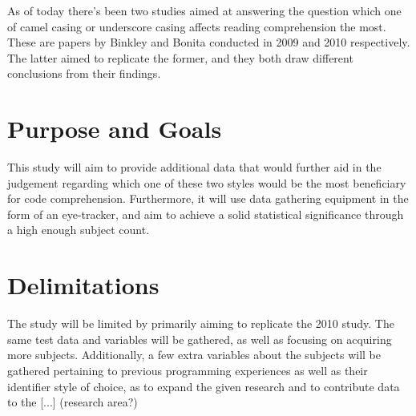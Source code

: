 As of today there's been two studies aimed at answering the question which one of camel casing or underscore casing affects reading comprehension the most. These are papers by Binkley \etal \cite{to-camelCase-or-under-score} and Bonita \etal \cite{eye-tracking-study} conducted in 2009 and 2010 respectively. The latter aimed to replicate the former, and they both draw different conclusions from their findings.





\section{Purpose and Goals}
\iffalse
\begin{itemize}
	\item Write about the grand scheme of things
	\item Set the correct expectations
	\item What can I expect to learn if I keep on reading?
	\item What are the success criteria for this work?
	\item How will the work be evaluated?
\end{itemize}
\fi

This study will aim to provide additional data that would further aid in the judgement regarding which one of these two styles would be the most beneficiary for code comprehension. Furthermore, it will use data gathering equipment in the form of an eye-tracker, and aim to achieve a solid statistical significance through a high enough subject count.

\section{Delimitations}
\iffalse
\begin{itemize}
	\item Scale down expectations and clarify
\end{itemize}
\fi

The study will be limited by primarily aiming to replicate the 2010 study. The same test data and variables will be gathered, as well as focusing on acquiring more subjects. Additionally, a few extra variables about the subjects will be gathered pertaining to previous programming experiences as well as their identifier style of choice, as to expand the given research and to contribute data to the [...] (research area?)